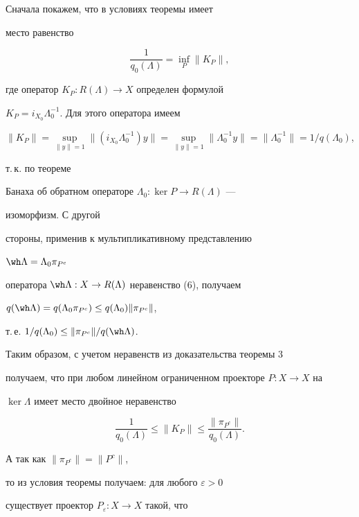 \begin{pf} Сначала покажем, что в условиях теоремы имеет 


место равенство 


\begin{equation} 


\frac{1}{q_0(\Lambda)}=\inf_P\|K_P\|, 


\end{equation} 


где оператор $K_P:R(\Lambda)\to X$ определен формулой 


$K_P=i_{X_0}\Lambda^{-1}_0$. Для этого оператора имеем 


$\|K_P\|=\sup\limits_{\|y\|=1}\|(i_{X_0}\Lambda^{-1}_0)y\|= 


\sup\limits_{\|y\|=1}\|\Lambda^{-1}_0y\|=\|\Lambda^{-1}_0\|= 


1/q(\Lambda_0)$, 


т.\,к. по теореме 


Банаха об обратном операторе $\Lambda_0:\ker P\to R(\Lambda)$ --- 


изоморфизм. С другой 


стороны, применив к мультипликативному представлению 


$\wh\Lambda=\Lambda_0\pi_{P^c}$ 


оператора $\wh\Lambda:X\to R(\Lambda)$ неравенство (6), получаем 


$q(\wh\Lambda)=q(\Lambda_0\pi_{P^c})\le q(\Lambda_0)\|\pi_{P^c}\|$, 


т.\,е. $1/q(\Lambda_0)\le\|\pi_{P^c}\|/q(\wh\Lambda)$. 


 


Таким образом, с учетом неравенств из доказательства теоремы 3 


получаем, что при любом линейном ограниченном проекторе $P:X\to X$ на  


$\ker\Lambda$ имеет место двойное неравенство 


\begin{equation} 


\frac{1}{q_0(\Lambda)}\le\|K_P\|\le 


\frac{\|\pi_{P^c}\|}{q_0(\Lambda)}. 


\end{equation} 


А так как $\|\pi_{P^c}\|=\|P^c\|$, 


то из условия теоремы получаем: для любого $\varepsilon>0$ 


существует проектор $P_\varepsilon:X\to X$ такой, что 



\end{pf}
